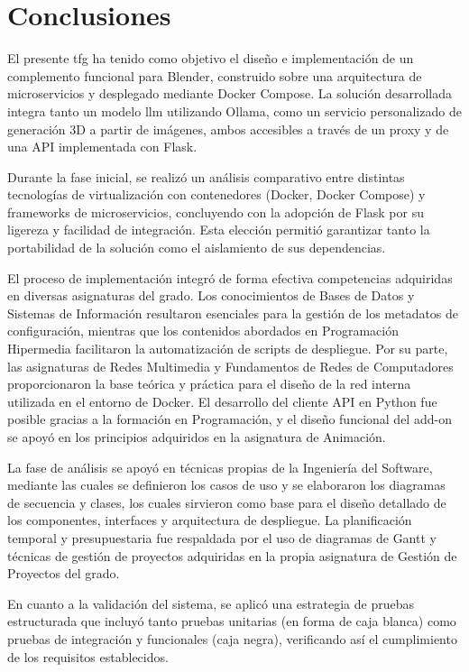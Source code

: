\section{Conclusiones}

El presente \gls{tfg} ha tenido como objetivo el diseño e implementación de un complemento funcional para Blender, construido sobre una arquitectura de microservicios y desplegado mediante Docker Compose. La solución desarrollada integra tanto un modelo \gls{llm} utilizando Ollama, como un servicio personalizado de generación 3D a partir de imágenes, ambos accesibles a través de un proxy y de una API implementada con Flask.

Durante la fase inicial, se realizó un análisis comparativo entre distintas tecnologías de virtualización con contenedores (Docker, Docker Compose) y frameworks de microservicios, concluyendo con la adopción de Flask por su ligereza y facilidad de integración. Esta elección permitió garantizar tanto la portabilidad de la solución como el aislamiento de sus dependencias.

El proceso de implementación integró de forma efectiva competencias adquiridas en diversas asignaturas del grado. Los conocimientos de Bases de Datos y Sistemas de Información resultaron esenciales para la gestión de los metadatos de configuración, mientras que los contenidos abordados en Programación Hipermedia facilitaron la automatización de scripts de despliegue. Por su parte, las asignaturas de Redes Multimedia y Fundamentos de Redes de Computadores proporcionaron la base teórica y práctica para el diseño de la red interna utilizada en el entorno de Docker. El desarrollo del cliente API en Python fue posible gracias a la formación en Programación, y el diseño funcional del add-on se apoyó en los principios adquiridos en la asignatura de Animación.

La fase de análisis se apoyó en técnicas propias de la Ingeniería del Software, mediante las cuales se definieron los casos de uso y se elaboraron los diagramas de secuencia y clases, los cuales sirvieron como base para el diseño detallado de los componentes, interfaces y arquitectura de despliegue. La planificación temporal y presupuestaria fue respaldada por el uso de diagramas de Gantt y técnicas de gestión de proyectos adquiridas en la propia asignatura de Gestión de Proyectos del grado.

En cuanto a la validación del sistema, se aplicó una estrategia de pruebas estructurada que incluyó tanto pruebas unitarias (en forma de caja blanca) como pruebas de integración y funcionales (caja negra), verificando así el cumplimiento de los requisitos establecidos.

